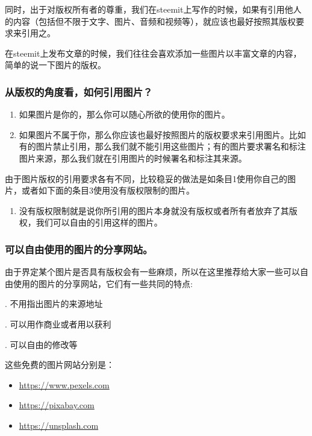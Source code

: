 \documentclass[]{ctexbook}
\providecommand{\tightlist}{%
  \setlength{\itemsep}{0pt}\setlength{\parskip}{0pt}}
\begin{document}
同时，出于对版权所有者的尊重，我们在steemit上写作的时候，如果有引用他人的内容（包括但不限于文字、图片、音频和视频等），就应该也最好按照其版权要求来引用之。

在steemit上发布文章的时候，我们往往会喜欢添加一些图片以丰富文章的内容，简单的说一下图片的版权。

\subsubsection{从版权的角度看，如何引用图片？}

\begin{enumerate}
\def\labelenumi{\arabic{enumi}.}
\item
  如果图片是你的，那么你可以随心所欲的使用你的图片。
\item
  如果图片不属于你，那么你应该也最好按照图片的版权要求来引用图片。比如有的图片禁止引用，那么我们就不能引用这些图片；有的图片要求署名和标注图片来源，那么我们就在引用图片的时候署名和标注其来源。
\end{enumerate}

由于图片版权的引用要求各有不同，比较稳妥的做法是如条目1使用你自己的图片，或者如下面的条目3使用没有版权限制的图片。

\begin{enumerate}
\def\labelenumi{\arabic{enumi}.}
\setcounter{enumi}{2}
\tightlist
\item
  没有版权限制就是说你所引用的图片本身就没有版权或者所有者放弃了其版权，我们可以自由的引用这样的图片。
\end{enumerate}

\subsubsection{可以自由使用的图片的分享网站。}

由于界定某个图片是否具有版权会有一些麻烦，所以在这里推荐给大家一些可以自由使用的图片的分享网站，它们有一些共同的特点:

. 不用指出图片的来源地址

. 可以用作商业或者用以获利

. 可以自由的修改等

这些免费的图片网站分别是：

\begin{itemize}
\item
  \url{https://www.pexels.com}
\item
  \url{https://pixabay.com}
\item
  \url{https://unsplash.com}
\end{itemize}
\end{document}
